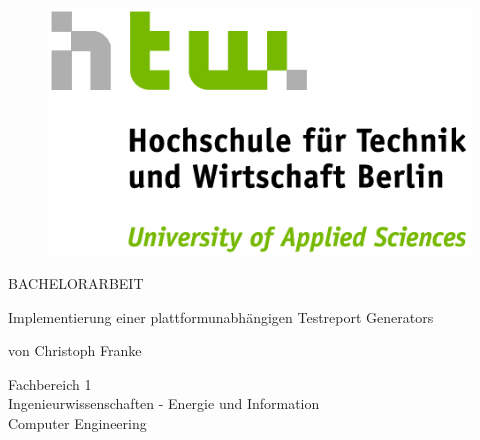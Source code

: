 \begin{titlepage}		%

\begin{figure}[H]
	\centering
	\begin{flushright}
	\includegraphics[scale=1.7]{images/HTW_Logo.jpg}
	\label{logo_htw}
	\end{flushright}
\end{figure}

\vspace*{\fill}

			
\ClearWallPaper

\begin{flushright}			%
{\huge 
BACHELORARBEIT
}
\vspace{20pt}

{\Large
	Implementierung einer plattformunabhängigen Testreport Generators	
	\vspace{20pt}	
	
	von Christoph Franke
}
\end{flushright}
\vspace*{\fill}

\begin{minipage}[c]{0.8\textwidth}

	\begin{flushright}
		
		Fachbereich 1 \\
		Ingenieurwissenschaften - Energie und Information \\
		Computer Engineering \\
		
	\end{flushright}


\end{minipage}
\end{titlepage}
